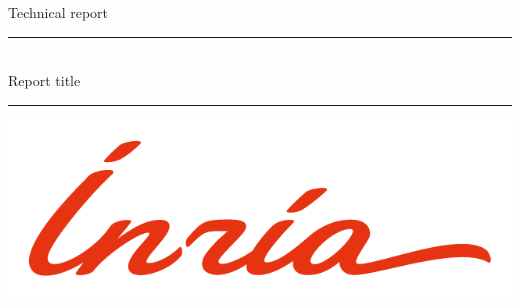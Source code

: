 \begin{task}
    \begin{gridlayout}{\textwidth}{15cm}
        \begin{row}{0.1}
            \begin{cell}{1}
                \centering
                Technical report
            \end{cell}
        \end{row}
        \begin{row}{0.15}
            \begin{cell}{1}
            \end{cell}
        \end{row}
        \begin{row}{0.15}
            \begin{cell}{1}
                \centering
                \rule{0.6\cellwidth}{0.4pt}\\[1.5ex]
                {\Large Report title}\\
                \rule{0.6\cellwidth}{0.4pt}
            \end{cell}
        \end{row}
        \begin{row}{0.3}
            \begin{cell}{1}
            \end{cell}
        \end{row}
        \begin{row}{0.3}
            \begin{cell}{0.5}
                \centering
                \includegraphics[width=\cellwidth]{doc-two/img/logo-inria.png}
            \end{cell}
            \begin{cell}{0.5}
                \centering

\end{cell}
\end{row}
\end{gridlayout}
\end{task}
